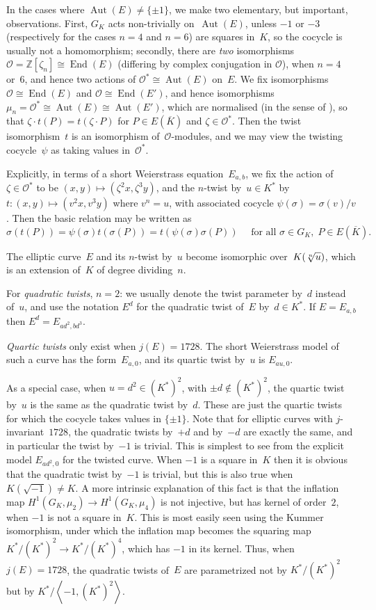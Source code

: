 \documentclass[12pt, reqno]{amsart}
\newcommand{\Z}{\mathbb{Z}}
\newcommand{\Kbar}{{\overline{K}}}
\newcommand{\calO}{\mathcal{O}}
\DeclareMathOperator{\Aut}{Aut}
\DeclareMathOperator{\End}{End}
\numberwithin{equation}{section}
\theoremstyle{definition}
\theoremstyle{remark}
\begin{document}
In the cases where $\Aut(E)\not=\{\pm1\}$, we make two elementary, but
important, observations. First, $G_K$ acts non-trivially on~$\Aut(E)$,
unless $-1$ or $-3$ (respectively for the cases $n=4$ and $n=6$) are
squares in~$K$, so the cocycle is usually not a homomorphism;
secondly, there are \emph{two} isomorphisms
$\calO=\Z[\zeta_n]\cong\End(E)$ (differing by complex conjugation in
$\calO$), when $n=4$ or~$6$, and hence two actions of
$\calO^*\cong\Aut(E)$ on~$E$.  We fix isomorphisms $\calO\cong\End(E)$
and $\calO\cong\End(E')$, and hence isomorphisms
$\mu_n=\calO^*\cong\Aut(E)\cong\Aut(E')$, which are normalised (in the
sense of \cite[Prop.~I.1.1]{SilvermanII}), so that $\zeta\cdot
t(P)=t(\zeta\cdot P)$ for $P\in E(\Kbar)$ and $\zeta\in\calO^*$. Then
the twist isomorphism~$t$ is an isomorphism of~$\calO$-modules, and we
may view the twisting cocycle~$\psi$ as taking values in~$\calO^*$.

Explicitly, in terms of a short Weierstrass equation~$E_{a,b}$, we fix
the action of~$\zeta\in\calO^*$ to be
$(x,y)\mapsto(\zeta^2x,\zeta^3y)$, and the $n$-twist by~$u\in K^*$ by
$t:(x,y)\mapsto(v^2x,v^3y)$ where $v^n=u$, with associated cocycle
$\psi(\sigma)=\sigma(v)/v$.  Then the basic relation may be written as
\begin{equation}\label{E:twist}
  \sigma(t(P)) = \psi(\sigma)t(\sigma(P)) = t(\psi(\sigma)\sigma(P))
   \quad \text{ for all } \sigma \in G_K,
  \; P \in E(\Kbar).
\end{equation}

The elliptic curve~$E$ and its $n$-twist by~$u$ become isomorphic
over~$K(\root n\of u)$, which is an extension of~$K$ of degree
dividing~$n$.

For \emph{quadratic twists}, $n=2$: we usually denote the twist
parameter by~$d$ instead of~$u$, and use the notation $E^d$ for the
quadratic twist of~$E$ by~$d\in K^*$.  If $E=E_{a,b}$ then
$E^d=E_{ad^2,bd^3}$.

\emph{Quartic twists} only exist when $j(E)=1728$.  The short
Weierstrass model of such a curve has the form~$E_{a,0}$, and its
quartic twist by~$u$ is $E_{au,0}$.

As a special case, when $u=d^2\in(K^*)^2$, with $\pm d\notin(K^*)^2$,
the quartic twist by~$u$ is the same as the quadratic twist by~$d$.
These are just the quartic twists for which the cocycle takes values
in $\{\pm1\}$.  Note that for elliptic curves with
$j$-invariant~$1728$, the quadratic twists by~$+d$ and by~$-d$ are
exactly the same, and in particular the twist by~$-1$ is trivial.
This is simplest to see from the explicit model $E_{ad^2,0}$ for the
twisted curve.  When $-1$ is a square in~$K$ then it is obvious that
the quadratic twist by~$-1$ is trivial, but this is also true when
$K(\sqrt{-1})\not=K$.  A more intrinsic explanation of this fact is
that the inflation map $H^1(G_K,\mu_2)\to H^1(G_K,\mu_4)$ is not
injective, but has kernel of order~$2$, when $-1$ is not a square
in~$K$.  This is most easily seen using the Kummer isomorphism, under
which the inflation map becomes the squaring map $K^*/(K^*)^2 \to
K^*/(K^*)^4$, which has $-1$ in its kernel.  Thus, when $j(E)=1728$,
the quadratic twists of~$E$ are parametrized not by $K^*/(K^*)^2$ but
by $K^*/\left<-1,(K^*)^2\right>$.
\end{document}
